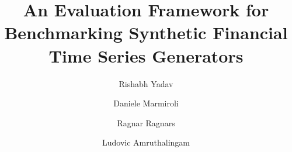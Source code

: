 \documentclass[preprint,12pt,authoryear]{elsarticle}
\def\corref#1{}%
\begin{document}
\begin{frontmatter}

\title{An Evaluation Framework for Benchmarking Synthetic Financial Time Series Generators}

\author[1]{Rishabh Yadav}\corref{cor1}
\author[2]{Daniele Marmiroli}
\author[2]{Ragnar Ragnars}
\author[1]{Ludovic Amruthalingam}


\address[1]{Lucerne University of Applied Sciences and Arts, Rotkreuz, Switzerland}
\address[2]{Ahead Innovation Labs, Schindellegi, Switzerland}


\end{frontmatter}








\clearpage

\clearpage



\end{document}
